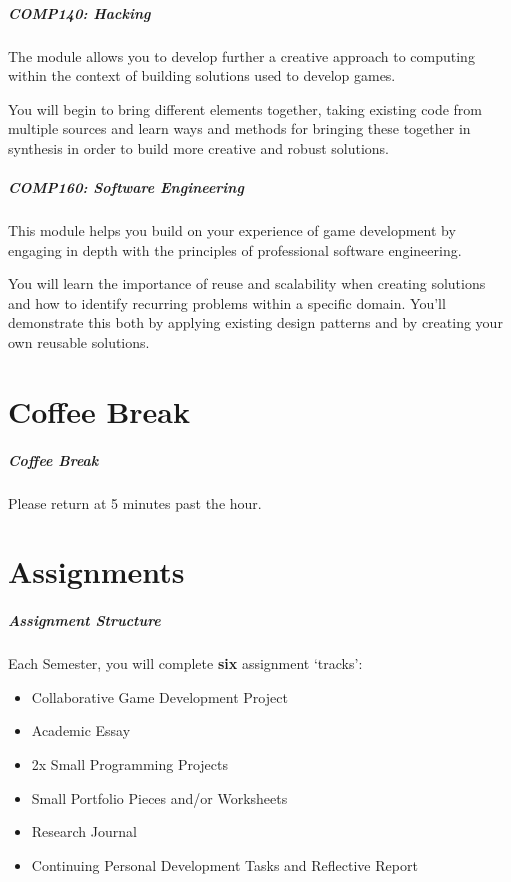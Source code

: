 \begin{frame}
	\frametitle{COMP140: Hacking}
	
	The module allows you to develop further a creative approach to computing within the context of building solutions used to develop games. 
	
	\vspace{2em}
	
	You will begin to bring different elements together, taking existing code from multiple sources and learn ways and methods for bringing these together in synthesis in order to build more creative and robust solutions. 

\end{frame}

\begin{frame}
	\frametitle{COMP160: Software Engineering}
	
	This module helps you build on your experience of game development by engaging in depth with the principles of professional software engineering. 
	
	\vspace{2em}
	
	You will learn the importance of reuse and scalability when creating solutions and how to identify recurring problems within a specific domain. You'll demonstrate this both by applying existing design patterns and by creating your own reusable solutions. 

\end{frame}

\part{Coffee Break}
\frame{\partpage}

\begin{frame}
	\frametitle{Coffee Break}
	
	Please return at 5 minutes past the hour.

\end{frame}

\part{Assignments}
\frame{\partpage}

\begin{frame}
	\frametitle{Assignment Structure}
	
	Each Semester, you will complete \textbf{six} assignment `tracks':
	
	\begin{itemize}
		\item Collaborative Game Development Project
		\item Academic Essay
		\item 2x Small Programming Projects
		\item Small Portfolio Pieces and/or Worksheets
		\item Research Journal
		\item Continuing Personal Development Tasks and Reflective Report
	\end{itemize}

\end{frame}

